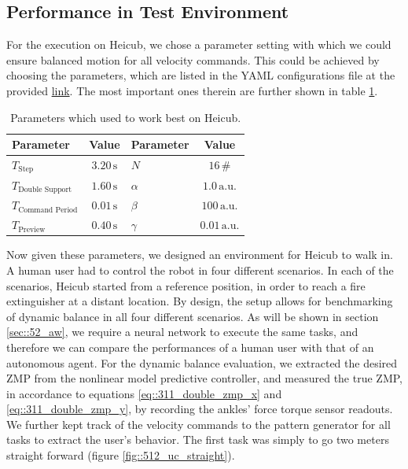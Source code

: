\subsection{Performance in Test Environment}
\label{sec::512_pt}
For the execution on Heicub, we chose a parameter setting with which we could ensure balanced motion for all velocity commands. This could be achieved by choosing the parameters, which are listed in the YAML configurations file at the provided \href{https://github.com/mhubii/nmpc_pattern_generator/blob/719fde0bb73925923de85cbf379c5523e075dfeb/libs/pattern_generator/configs.yaml#L1}{link}. The most important ones therein are further shown in table \ref{tab::512_params}.
\begin{table}
	\centering
	\begin{tabular}{lclc}
		Parameter&Value&Parameter&Value\\
		\hline
		$T_{\text{Step}}$ & $3.20\,\text{s}$ & $N$ & $16\,\text{\#}$ \\
		$T_{\text{Double Support}}$ & $1.60\,\text{s}$ & $\alpha$ & $1.0\,\text{a.u.}$ \\
		$T_{\text{Command Period}}$  & $0.01\,\text{s}$& $\beta$ & $100\,\text{a.u.}$ \\
		$T_{\text{Preview}}$ & $0.40\,\text{s}$ & $\gamma$ & $0.01\,\text{a.u.}$
	\end{tabular}
	\caption{Parameters which used to work best on Heicub.}
	\label{tab::512_params}
\end{table}
Now given these parameters, we designed an environment for Heicub to walk in. A human user had to control the robot in four different scenarios. In each of the scenarios, Heicub started from a reference position, in order to reach a fire extinguisher at a distant location. By design, the setup allows for benchmarking of dynamic balance in all four different scenarios. As will be shown in section \ref{sec::52_aw}, we require a neural network to execute the same tasks, and therefore we can compare the performances of a human user with that of an autonomous agent. For the dynamic balance evaluation, we extracted the desired ZMP from the nonlinear model predictive controller, and measured the true ZMP, in accordance to equations \ref{eq::311_double_zmp_x} and \ref{eq::311_double_zmp_y}, by recording the ankles' force torque sensor readouts. We further kept track of the velocity commands to the pattern generator for all tasks to extract the user's behavior. The first task was simply to go two meters straight forward (figure \ref{fig::512_uc_straight}).
